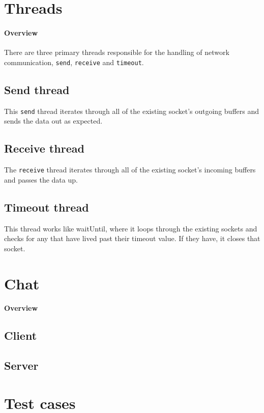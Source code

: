 \documentclass[]{article}
\begin{document}
\section{Threads}
\paragraph{Overview}
There are three primary threads responsible for the handling of network communication, \texttt{send}, \texttt{receive} and \texttt{timeout}.

\subsection{Send thread}
This \texttt{send} thread iterates through all of the existing socket's outgoing buffers and sends the data out as expected.
\subsection{Receive thread}
The \texttt{receive} thread iterates through all of the existing socket's incoming buffers and passes the data up.
\subsection{Timeout thread}
This thread works like waitUntil, where it loops through the existing sockets and checks for any that have lived past their timeout value. If they have, it closes that socket.

\section{Chat}
\paragraph{Overview}
\subsection{Client}
\subsection{Server}

\section{Test cases}
\end{document}
